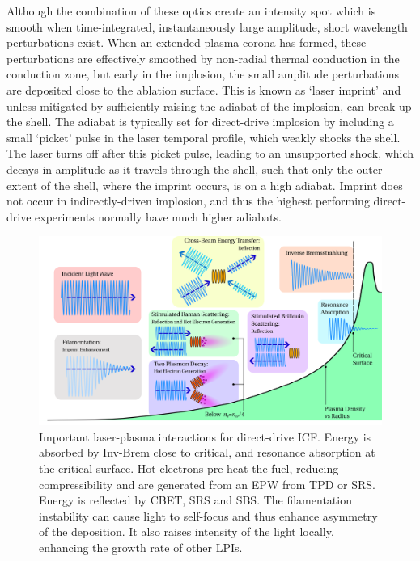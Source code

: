 Although the combination of these optics create an intensity spot which is smooth when time-integrated, instantaneously large amplitude, short wavelength perturbations exist.
When an extended plasma corona has formed, these perturbations are effectively smoothed by non-radial thermal conduction in the conduction zone, but early in the implosion, the small amplitude perturbations are deposited close to the ablation surface.
This is known as `laser imprint' and unless mitigated by sufficiently raising the adiabat of the implosion, can break up the shell.
The adiabat is typically set for direct-drive implosion by including a small `picket' pulse in the laser temporal profile, which weakly shocks the shell.
The laser turns off after this picket pulse, leading to an unsupported shock, which decays in amplitude as it travels through the shell, such that only the outer extent of the shell, where the imprint occurs, is on a high adiabat.
Imprint does not occur in indirectly-driven implosion, and thus the highest performing direct-drive experiments normally have much higher adiabats.

\begin{figure}[t!]
    \includegraphics[width=\linewidth]{Introduction/Images/LPI diagram.png}
    \centering
    \caption{Important laser-plasma interactions for direct-drive \ac{ICF}.
    Energy is absorbed by \ac{Inv-Brem} close to critical, and resonance absorption at the critical surface.
    Hot electrons pre-heat the fuel, reducing compressibility and are generated from an \ac{EPW} from \ac{TPD} or \ac{SRS}.
    Energy is reflected by \ac{CBET}, \ac{SRS} and \ac{SBS}.
    The filamentation instability can cause light to self-focus and thus enhance asymmetry of the deposition.
    It also raises intensity of the light locally, enhancing the growth rate of other \ac{LPIs}.
    }%
    \label{fig:intro_dd_lpis}
\end{figure}

